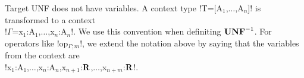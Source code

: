 Target UNF does not have variables. 
A context type !T=[A$_1$,$\ldots$,A$_n$]! is transformed to a context \\
!$\Gamma$=x$_1$:A$_1$,$\ldots$,x$_n$:A$_n$!.
We use this convention when definiting $\mathbf{UNF}^{-1}$. 
For operators like !op$_{\Gamma;m}$!, we extend the notation above by saying that the variables from the context are \\
!x$_1$:A$_1$,$\ldots$,x$_n$:A$_n$,x$_{n+1}$:$\mathbf{R}$,$\ldots$,x$_{n+m}$:$\mathbf{R}$!.


